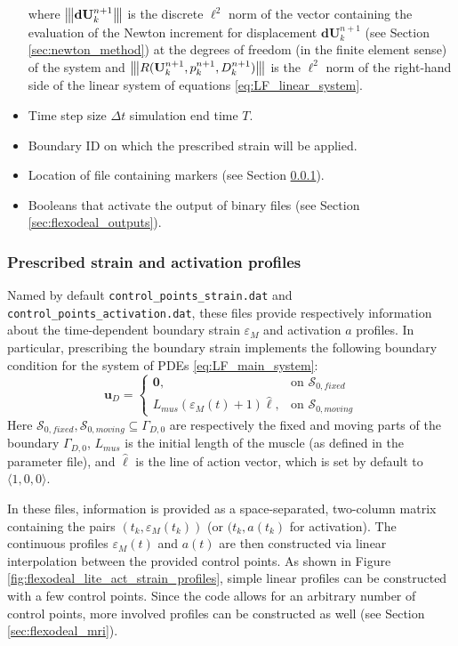 \documentclass{sfuthesis}
\numberwithin{equation}{section}
\numberwithin{figure}{chapter}
\numberwithin{table}{chapter}
\theoremstyle{definition}
\def\*#1{{\mathbf{#1}}} %
\newcommand{\vertiii}[1]{{\left\vert\kern-0.25ex\left\vert\kern-0.25ex\left\vert #1 
    \right\vert\kern-0.25ex\right\vert\kern-0.25ex\right\vert}}
\begin{document}
\begin{itemize}
\[    \]
    where $\vertiii{\*d \*U_k^{n+1}}$ is the discrete $\ell^2$ norm of the vector containing the evaluation of the Newton increment for displacement $\*d \*U_k^{n+1}$ (see Section \ref{sec:newton_method}) at the degrees of freedom (in the finite element sense) of the system and $\vertiii{R(\*U_k^{n+1}, p_k^{n+1}, D_k^{n+1})}$ is the $\ell^2$ norm of the right-hand side of the linear system of equations \eqref{eq:LF_linear_system}.
    \item Time step size $\Delta t $ simulation end time $T$.
    \item Boundary ID on which the prescribed strain will be applied.
    \item Location of file containing markers (see Section \ref{sec:prescribed_act_strain}).
    \item Booleans that activate the output of binary files (see Section \ref{sec:flexodeal_outputs}).
\end{itemize}

\subsubsection{Prescribed strain and activation profiles} \label{sec:prescribed_act_strain}

Named by default \texttt{control\_points\_strain.dat} and \texttt{control\_points\_activation.dat}, these files provide respectively information about the time-dependent boundary strain $\varepsilon_M$ and activation $a$ profiles. In particular, prescribing the boundary strain implements the following boundary condition for the system of PDEs \eqref{eq:LF_main_system}:
\begin{equation}
    \*u_D = \left\{ \begin{array}{ll}
        \*0, & \text{on } \mathcal{S}_{0,fixed} \\
        L_{mus} \left( \varepsilon_M(t) + 1 \right) \widehat{\bm{\ell}}, & \text{on } \mathcal{S}_{0,moving}
    \end{array}\right.
\end{equation}
Here $\mathcal{S}_{0,fixed}, \mathcal{S}_{0,moving}  \subseteq \Gamma_{D,0}$ are respectively the fixed and moving parts of the boundary $\Gamma_{D,0}$, $L_{mus}$ is the initial length of the muscle (as defined in the parameter file), and $\widehat{\bm{\ell}}$ is the line of action vector,  which is set by default to $\langle 1,0,0 \rangle$.

In these files, information is provided as a space-separated, two-column matrix containing the pairs $(t_k, \varepsilon_M(t_k))$ (or $(t_k, a(t_k)$ for activation). The continuous profiles $\varepsilon_M(t)$ and $a(t)$ are then constructed via linear interpolation between the provided control points. As shown in Figure \ref{fig:flexodeal_lite_act_strain_profiles}, simple linear profiles can be constructed with a few control points. Since the code allows for an arbitrary number of control points, more involved profiles can be constructed as well (see Section \ref{sec:flexodeal_mri}).
\end{document}
